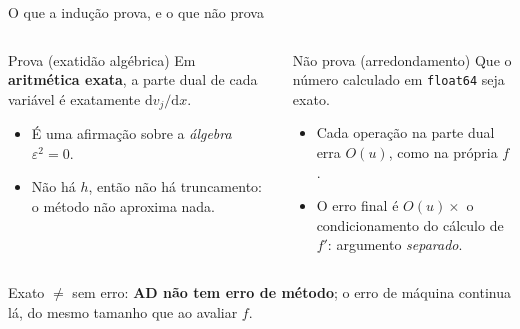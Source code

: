 \documentclass[aspectratio=169,11pt]{beamer}
\begin{document}
\begin{frame}{O que a indução prova, e o que não prova}
  \begin{columns}[T]
    \begin{exampleblock}{Prova (exatidão algébrica)}
      Em \textbf{aritmética exata}, a parte dual de cada variável é exatamente $\mathrm dv_j/\mathrm dx$.
      \begin{itemize}
        \item É uma afirmação sobre a \emph{álgebra} $\varepsilon^2=0$.
        \item Não há $h$, então não há truncamento: o método não aproxima nada.
      \end{itemize}
    \end{exampleblock}
    \begin{alertblock}{Não prova (arredondamento)}
      Que o número calculado em \texttt{float64} seja exato.
      \begin{itemize}
        \item Cada operação na parte dual erra $O(u)$, como na própria $f$.
        \item O erro final é $O(u)\times$ o condicionamento do cálculo de $f'$: argumento \emph{separado}.
      \end{itemize}
    \end{alertblock}
  \end{columns}
  \vspace{0.6em}
  \begin{block}{}
    \centering Exato $\neq$ sem erro: \textbf{AD não tem erro de método}; o erro de máquina continua lá, do mesmo tamanho que ao avaliar $f$.
  \end{block}
\end{frame}
\end{document}
